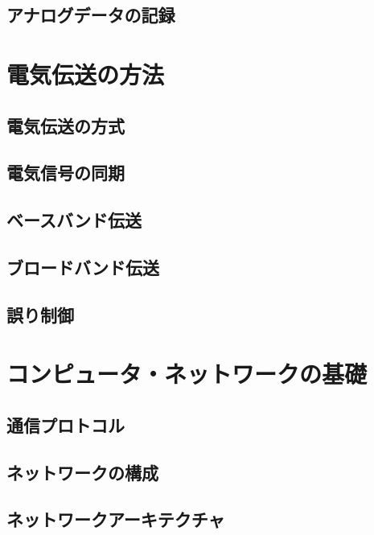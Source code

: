 \documentclass[a4j,12pt]{jreport}
\begin{document}
\chapter{アナログデータの記録}


\part{電気伝送の方法}

\chapter{電気伝送の方式}


\chapter{電気信号の同期}


\chapter{ベースバンド伝送}


\chapter{ブロードバンド伝送}


\chapter{誤り制御}


\part{コンピュータ・ネットワークの基礎}

\chapter{通信プロトコル}

\chapter{ネットワークの構成}

\chapter{ネットワークアーキテクチャ}
\end{document}
